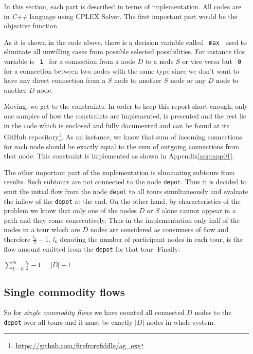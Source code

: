 In this section, each part is described in terms of implementation. All codes
are in {\it C++} language using CPLEX Solver.
The first important part would be the objective function.

As it is shown in the code above, there is a decision variable called
\texttt{ max } used to eliminate all unwilling cases from possible selected
possibilities. For instance this variable is \texttt{ 1 } for a connection from
a node $D$ to a node $S$ or vice versa but \texttt{ 0 } for a connection between
two nodes with the same type since we don't want to have any direct connection
from a $S$ node to another $S$ node or any $D$ node to another $D$ node.

Moving, we get to the constraints. In order to keep this report short enough,
only one samples of how the constraints are implemented, is presented and the
rest lie in the code which is enclosed and fully documented and can be found at
its GitHub repository\footnote{\url{https://github.com/firefrorefiddle/ag_ex}}.
As an instance, we know that sum of incoming connections for each node should
be exactly equal to the sum of outgoing connections from that node. This
constraint is implemented as shown in Appendix\ref{app:app01}.

The other important part of the implementation is eliminating subtours from
results. Such subtours are not connected to the node \texttt{depot}. Thus it is
decided to emit the initial flow from the node \texttt{depot} to all tours
simultaneously and evaluate the inflow of the  \texttt{depot} at the end. On the
other hand, by characteristics of the problem we know that only one of the nodes
$D$ or $S$ alone cannot appear in a path and they come consecutively. Thus in
the implementation only half of the nodes in a tour which are $D$ nodes are
considered as consumers of flow and therefore $\frac{l_k}{2}-1$, $l_k$ denoting
the number of participant nodes in each tour, is the flow amount emitted from
the \texttt{depot} for that tour.
Finally:

\begin{center}
$\sum_{k=0}^{m}{\frac{l_k}{2}-1} = |D| - 1$
\end{center}

\subsection{Single commodity flows}

So for {\it single commodity flows} we have counted all connected $D$ nodes to
the \texttt{depot} over all tours and it must be exactly $|D|$ nodes in whole
system.


